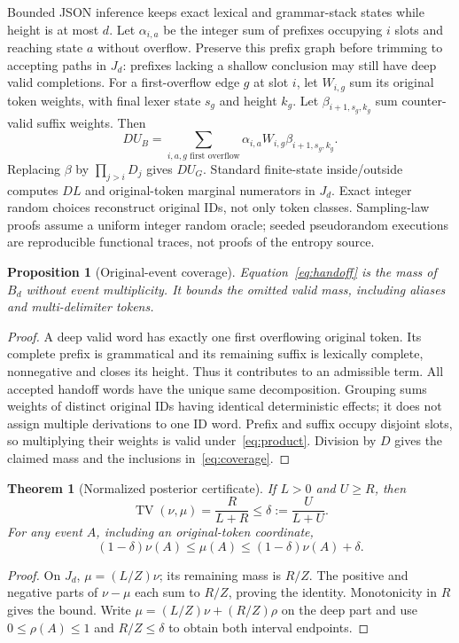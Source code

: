 \documentclass[12pt]{article}
\theoremstyle{readable}
\newtheorem{theorem}{Theorem}
\newtheorem{proposition}{Proposition}
\begin{document}
Bounded JSON inference keeps exact lexical and grammar-stack states while
height is at most $d$. Let $\alpha_{i,a}$ be the integer sum of prefixes
occupying $i$ slots and reaching state $a$ without overflow. Preserve this
prefix graph before trimming to accepting paths in $J_d$: prefixes lacking
a shallow conclusion may still have deep valid completions. For a first-overflow
edge $g$ at slot $i$, let $W_{i,g}$ sum its original token weights, with final
lexer state $s_g$ and height $k_g$. Let $\beta_{i+1,s_g,k_g}$ sum counter-valid
suffix weights. Then
\begin{equation}
 DU_B=\sum_{i,a,g\text{ first overflow}}
        \alpha_{i,a}W_{i,g}\beta_{i+1,s_g,k_g}.
 \label{eq:handoff}
\end{equation}
Replacing $\beta$ by $\prod_{j>i}D_j$ gives $DU_G$. Standard finite-state
inside/outside computes $DL$ and original-token marginal numerators in $J_d$.
Exact integer random choices reconstruct original IDs, not only token classes.
Sampling-law proofs assume a uniform integer random oracle; seeded pseudorandom
executions are reproducible functional traces, not proofs of the entropy source.

\begin{proposition}[Original-event coverage]
Equation~\eqref{eq:handoff} is the mass of $B_d$ without event multiplicity.
It bounds the omitted valid mass, including aliases and multi-delimiter tokens.
\end{proposition}
\begin{proof}
A deep valid word has exactly one first overflowing original token. Its
complete prefix is grammatical and its remaining suffix is lexically complete,
nonnegative and closes its height. Thus it contributes to an admissible term.
All accepted handoff words have the unique same decomposition. Grouping sums
weights of distinct original IDs having identical deterministic effects; it
does not assign multiple derivations to one ID word. Prefix and suffix occupy
disjoint slots, so multiplying their weights is valid under~\eqref{eq:product}.
Division by $D$ gives the claimed mass and the inclusions in~\eqref{eq:coverage}.
\end{proof}

\begin{theorem}[Normalized posterior certificate]
If $L>0$ and $U\ge R$, then
\begin{equation}
 \operatorname{TV}(\nu,\mu)=\frac R{L+R}
       \le\delta:=\frac U{L+U}.
 \label{eq:tv}
\end{equation}
For any event $A$, including an original-token coordinate,
\begin{equation}
 (1-\delta)\nu(A)\le\mu(A)\le(1-\delta)\nu(A)+\delta.
 \label{eq:interval}
\end{equation}
\end{theorem}
\begin{proof}
On $J_d$, $\mu=(L/Z)\nu$; its remaining mass is $R/Z$. The positive and
negative parts of $\nu-\mu$ each sum to $R/Z$, proving the identity. Monotonicity
in $R$ gives the bound. Write $\mu=(L/Z)\nu+(R/Z)\rho$ on the deep part and
use $0\le\rho(A)\le1$ and $R/Z\le\delta$ to obtain both interval endpoints.
\end{proof}
\end{document}

